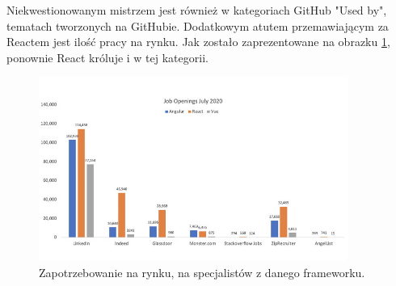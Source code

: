 \documentclass[12pt]{article}
\begin{document}
\begin{sloppypar}
{{    Niekwestionowanym mistrzem jest również w kategoriach GitHub "Used by", tematach tworzonych na GitHubie.\cite{frontend-popularity} Dodatkowym atutem przemawiającym za Reactem jest 
    ilość pracy na rynku. Jak zostało zaprezentowane na obrazku \ref{fig:frontend-jobs}, ponownie React króluje i w tej kategorii. 
    \begin{figure}[H]
      \centering
      \includegraphics[width=0.9\textwidth]{frontend_jobs.jpg}
      \caption{Zapotrzebowanie na rynku, na specjalistów z danego frameworku.\cite{accenture}}
      \label{fig:frontend-jobs}
    \end{figure}
  }
}
\end{sloppypar}
\end{document}
